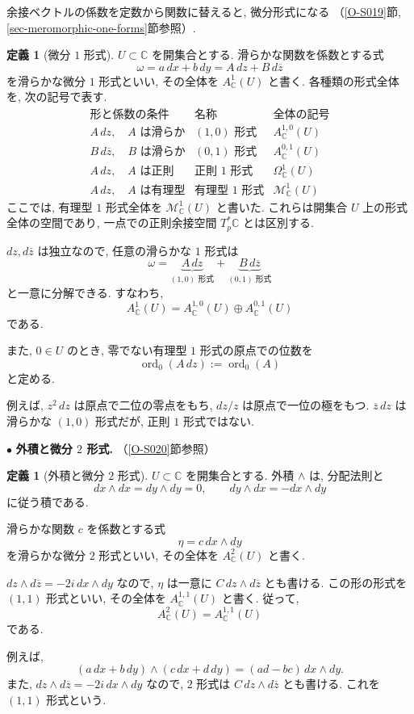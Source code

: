 \documentclass[dvipdfmx,a4paper,11pt]{article} %
\newcommand{\C}{\mathbb{C}}
\theoremstyle{definition}
\numberwithin{equation}{section}
\newtheorem{dfn}[thm]{定義}
\begin{document}
余接ベクトルの係数を定数から関数に替えると, 微分形式になる
（\ref{O-S019}節, \ref{sec-meromorphic-one-forms}節参照）.

\begin{dfn}[微分 $1$ 形式]
$U\subset\C$ を開集合とする.
滑らかな関数を係数とする式
\[
\omega=a\,dx+b\,dy=A\,dz+B\,d\overline z
\]
を滑らかな微分 $1$ 形式といい, その全体を $A_\C^1(U)$ と書く.
各種類の形式全体を, 次の記号で表す.
\[
\begin{array}{c|c|c}
\text{形と係数の条件}&\text{名称}&\text{全体の記号}\\ \hline
A\,dz,\quad A\text{ は滑らか}
&(1,0)\text{ 形式}&A_{\C}^{1,0}(U)\\
B\,d\overline z,\quad B\text{ は滑らか}
&(0,1)\text{ 形式}&A_{\C}^{0,1}(U)\\
A\,dz,\quad A\text{ は正則}
&\text{正則 }1\text{ 形式}&\Omega_{\C}^1(U)\\
A\,dz,\quad A\text{ は有理型}
&\text{有理型 }1\text{ 形式}&\mathcal M_{\C}^1(U)
\end{array}
\]
ここでは, 有理型 $1$ 形式全体を $\mathcal M_\C^1(U)$ と書いた.
これらは開集合 $U$ 上の形式全体の空間であり,
一点での正則余接空間 $T_p^*\C$ とは区別する.

$dz,d\overline z$ は独立なので, 任意の滑らかな $1$ 形式は
\[
\omega
=\underbrace{A\,dz}_{(1,0)\text{ 形式}}
+\underbrace{B\,d\overline z}_{(0,1)\text{ 形式}}
\]
と一意に分解できる.
すなわち,
\[
A_\C^1(U)=A_\C^{1,0}(U)\oplus A_\C^{0,1}(U)
\]
である.

また, $0\in U$ のとき, 零でない有理型 $1$ 形式の原点での位数を
\[
\operatorname{ord}_0(A\,dz):=\operatorname{ord}_0(A)
\]
と定める.
\end{dfn}


例えば, $z^2\,dz$ は原点で二位の零点をもち,
$dz/z$ は原点で一位の極をもつ.
$\overline z\,dz$ は滑らかな $(1,0)$ 形式だが,
正則 $1$ 形式ではない.

\medskip
\noindent
$\bullet$ \textbf{外積と微分 $2$ 形式.}
（\ref{O-S020}節参照）

\begin{dfn}[外積と微分 $2$ 形式]
$U\subset\C$ を開集合とする.
外積 $\wedge$ は, 分配法則と
\[
dx\wedge dx=dy\wedge dy=0,\qquad
dy\wedge dx=-dx\wedge dy
\]
に従う積である.

滑らかな関数 $c$ を係数とする式
\[
\eta=c\,dx\wedge dy
\]
を滑らかな微分 $2$ 形式といい,
その全体を $A_\C^2(U)$ と書く.

$dz\wedge d\overline z=-2i\,dx\wedge dy$ なので,
$\eta$ は一意に $C\,dz\wedge d\overline z$ とも書ける.
この形の形式を $(1,1)$ 形式といい,
その全体を $A_\C^{1,1}(U)$ と書く.
従って,
\[
A_\C^2(U)=A_\C^{1,1}(U)
\]
である.
\end{dfn}
例えば,
\[
(a\,dx+b\,dy)\wedge(c\,dx+d\,dy)
=(ad-bc)\,dx\wedge dy.
\]
また, $dz\wedge d\overline z=-2i\,dx\wedge dy$ なので,
$2$ 形式は $C\,dz\wedge d\overline z$ とも書ける.
これを $(1,1)$ 形式という.
\end{document}
